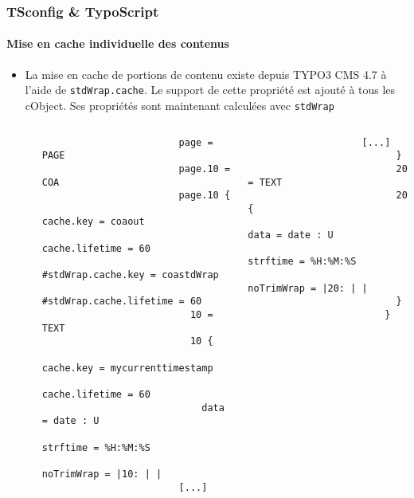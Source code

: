 \begin{frame}[fragile]
	\frametitle{TSconfig \& TypoScript}
	\framesubtitle{Mise en cache individuelle des contenus}

	\lstset{basicstyle=\tiny\ttfamily}

	\begin{itemize}

		\item La mise en cache de portions de contenu existe depuis TYPO3 CMS 4.7 à
			l'aide de \texttt{stdWrap.cache}. Le support de cette propriété est ajouté
			à tous les cObject. Ses propriétés sont maintenant calculées avec \texttt{stdWrap}

			\begin{columns}[T]
				\begin{column}{.07\textwidth}
                \end{column}
				\begin{column}{.465\textwidth}
					\begin{lstlisting}
						page = PAGE
						page.10 = COA
						page.10 {
						  cache.key = coaout
						  cache.lifetime = 60
						  #stdWrap.cache.key = coastdWrap
						  #stdWrap.cache.lifetime = 60
						  10 = TEXT
						  10 {
						    cache.key = mycurrenttimestamp
						    cache.lifetime = 60
						    data = date : U
						    strftime = %H:%M:%S
						    noTrimWrap = |10: | |
						[...]
					\end{lstlisting}
				\end{column}

				\begin{column}{.465\textwidth}
					\begin{lstlisting}
					[...]
						  }
						  20 = TEXT
						  20 {
						    data = date : U
						    strftime = %H:%M:%S
						    noTrimWrap = |20: | |
						  }
						}
					\end{lstlisting}

				\end{column}
			\end{columns}

	\end{itemize}

\end{frame}

